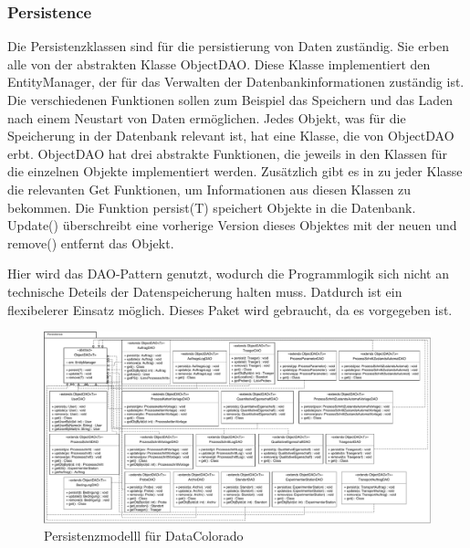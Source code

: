 \documentclass[enabledeprecatedfontcommands,fontsize=12pt,paper=a4,twoside]{scrartcl}
\begin{document}
\subsubsection{Persistence}

{
Die Persistenzklassen sind für die persistierung von Daten zuständig. Sie erben alle von der abstrakten Klasse ObjectDAO. Diese Klasse implementiert den EntityManager, der für das Verwalten der Datenbankinformationen zuständig ist. Die verschiedenen Funktionen sollen zum Beispiel das Speichern und das Laden nach einem Neustart von Daten ermöglichen. Jedes Objekt, was für die Speicherung in der Datenbank relevant ist, hat eine Klasse, die von ObjectDAO erbt. ObjectDAO hat drei abstrakte Funktionen, die jeweils in den Klassen für die einzelnen Objekte implementiert werden. Zusätzlich gibt es in zu jeder Klasse die relevanten Get Funktionen, um Informationen aus diesen Klassen zu bekommen. Die Funktion persist(T) speichert Objekte in die Datenbank. Update() überschreibt eine vorherige Version dieses Objektes mit der neuen und remove() entfernt das Objekt.

Hier wird das DAO-Pattern genutzt, wodurch die Programmlogik sich nicht an technische Deteils der Datenspeicherung halten muss. Datdurch ist ein flexibelerer Einsatz möglich. 
Dieses Paket wird gebraucht, da es vorgegeben ist. 
}

 \begin{figure}
  \caption{Persistenzmodelll für DataColorado}
  \centering
  \includegraphics[width=\textwidth]{UML/Persistence}
 \end{figure}
 \newpage
\end{document}
